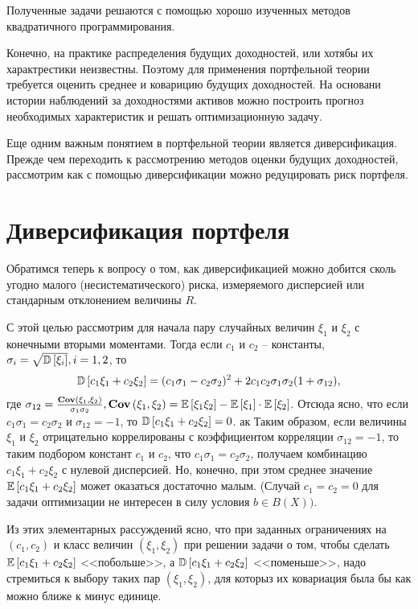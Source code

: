 Полученные задачи решаются с помощью хорошо изученных методов квадратичного программирования.

Конечно, на практике распределения будущих доходностей, или хотябы их характрестики неизвестны.
Поэтому для применения портфельной теории требуется оценить среднее и коварицию будущих доходностей.
На основани истории наблюдений за доходностями активов можно построить прогноз необходимых характеристик
и решать оптимизационную задачу.

Еще одним важным понятием в портфельной теории является диверсификация. Прежде чем переходить к рассмотрению методов оценки
будущих доходностей, рассмотрим как с помощью диверсификации можно редуцировать риск портфеля.

\section{Диверсификация портфеля}

Обратимся теперь к вопросу о том, как диверсификацией можно добится сколь угодно малого (несистематического) риска, измеряемого дисперсией
или стандарным отклонением величины $R$.

С этой целью рассмотрим для начала пару случайных величин $\xi_1$ и $\xi_2$ с конечными вторыми моментами. Тогда если $c_1$ и $c_2$ -- константы,
$\sigma_i = \sqrt{\mathbb{D}\left[\xi_i\right]}, i=1,2$, то 
\begin{align}
\mathbb{D}\left[c_1 \xi_1 + c_2 \xi_2\right] = 
	(c_1 \sigma_1 - c_2 \sigma_2)^2 + 2 c_1 c_2 \sigma_1 \sigma_2 (1 + \sigma_{12}),
\end{align}
где $\sigma_{12} = \frac{\textbf{Cov}\left(\xi_1, \xi_2\right)}{\sigma_1 \sigma_2}, \textbf{Cov}\left(\xi_1, \xi_2\right) = \mathbb{E}\left[\xi_1 \xi_2\right] - \mathbb{E}\left[\xi_1\right] \cdot \mathbb{E}\left[\xi_2\right]$.
Отсюда ясно, что если $c_1 \sigma_1 = c_2 \sigma_2$ и $\sigma_{12} = -1$, то $\mathbb{D}\left[c_1 \xi_1 + c_2 \xi_2\right] = 0$.
ак
Таким образом, если величины $\xi_1$ и $\xi_2$ отрицательно коррелированы с коэффициентом корреляции $\sigma_{12} = -1$, то таким подбором
констант $c_1$ и $c_2$, что $c_1 \sigma_1 = c_2 \sigma_2$, получаем комбинацию $c_1 \xi_1 + c_2 \xi_2$ с нулевой дисперсией. Но,
конечно, при этом среднее значение $\mathbb{E}\left[c_1 \xi_1 + c_2 \xi_2\right]$ может оказаться достаточно малым. (Случай $c_1 = c_2 = 0$ для задачи 
оптимизации не интересен в силу условия $b \in B(X))$.

Из этих элементарных рассуждений ясно, что при заданных ограничениях на $(c_1, c_2)$ и класс величин $(\xi_1, \xi_2)$ при решении задачи о том,
чтобы сделать $\mathbb{E}\left[c_1 \xi_1 + c_2 \xi_2\right]$ <<побольше>>, а $\mathbb{D}\left[c_1 \xi_1 + c_2 \xi_2\right]$ <<поменьше>>, надо стремиться к выбору таких пар 
$(\xi_1, \xi_2)$, для которыз их ковариация была бы как можно ближе к минус единице.

